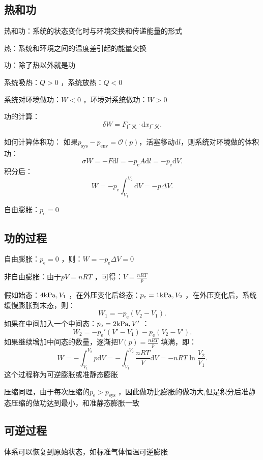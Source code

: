 \subsection{热和功}%
\label{sub:热和功}
\begin{defi}
    热和功：系统的状态变化时与环境交换和传递能量的形式

    热：系统和环境之间的温度差引起的能量交换
    
    功：除了热以外就是功
\end{defi}
系统吸热：$Q>0$ ，系统放热：$Q<0$

系统对环境做功：$W<0$ ，环境对系统做功：$W>0$

功的计算：\[
    \delta W = F_\text{广义} \cdot \mathrm{d}x_\text{广义}
.\]

如何计算体积功：
如果$p_\text{sys}-p_\text{env}=\mathscr{O}\left( p \right)$，活塞移动$\mathrm{d}l$，则系统对环境做的体积功：\[
    \sigma W = -F\mathrm{d}l = -p_\text{e}A\mathrm{d}l = -p_\text{e}\mathrm{d}V
.\]
积分后：\[
    W = -p_\text{e}\int_{V_1}^{V_2} \mathrm{d}V = -p\Delta V
.\]
\begin{notation}
    自由膨胀：$p_\text{e}=0$
\end{notation}
\subsection{功的过程}%
\label{sub:功的过程}
\begin{eg}
    自由膨胀：$p_\text{e}=0$ ，则：$W=-p_\text{e}\Delta V = 0$
\end{eg}
非自由膨胀：由于$pV=nRT $ ，可得：$V = \frac{nRT }{p}$

假如始态：$4\ce{kPa}, V_1$ ，在外压变化后终态：$p_\text{e}=1\ce{kPa}, V_2$ ，在外压变化后，系统缓慢膨胀到末态，则：\[
    W_1 = -p_\text{e}\left( V_2-V_1 \right)
.\]
如果在中间加入一个中间态：$p_\text{e}=2\ce{kPa}, V'$ ：\[
    W_2 = -p_\text{e}'\left( V'-V_1 \right)-p_\text{e}\left( V_2-V' \right)
.\]
如果继续增加中间态的数量，逐渐把$V\left( p \right) = \frac{nRT }{p}$ 填满，即：\[
    W = -\int_{V_1}^{V_2} p \mathrm{d}V = -\int_{V_1}^{V_2} \frac{nRT }{V} \mathrm{d}V = -nRT \ln \frac{V_2}{V_1}
.\]
这个过程称为可逆膨胀或准静态膨胀

压缩同理，由于每次压缩的$p_\text{e}>p_\text{sys}$ ，因此做功比膨胀的做功大,但是积分后准静态压缩的做功达到最小，和准静态膨胀一致
\subsection{可逆过程}%
\label{sub:可逆过程}
体系可以恢复到原始状态，如标准气体恒温可逆膨胀

